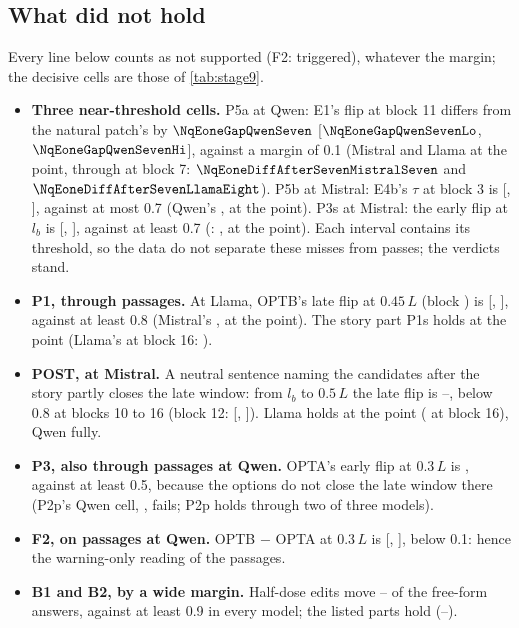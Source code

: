 \subsection{What did not hold}\label{app:s9-misses}

Every line below counts as not supported (F2: triggered), whatever the margin; the decisive cells are those of \cref{tab:stage9}.
\begin{itemize}\setlength\itemsep{1pt}
  \item \textbf{Three near-threshold cells.} P5a at Qwen: E1's \fmtListA{} flip at block 11 differs from the natural patch's by $\NqEoneGapQwenSeven$ [$\NqEoneGapQwenSevenLo$, $\NqEoneGapQwenSevenHi$], against a margin of 0.1 (Mistral and Llama at the point, through \fmtListA{} at block 7: $\NqEoneDiffAfterSevenMistralSeven$ and $\NqEoneDiffAfterSevenLlamaEight$). P5b at Mistral: E4b's $\tau$ at block 3 is \NqTauEfourbThreeMistralSeven{} [\NqTauEfourbThreeMistralSevenLo{}, \NqTauEfourbThreeMistralSevenHi{}], against at most 0.7 (Qwen's \NqTauEfourbThreeQwenSeven{}, at the point). P3s at Mistral: the early \fmtListA{} flip at $l_b$ is \NqPthreeEarlyAfterMistralSeven{} [\NqPthreeEarlyAfterMistralSevenLo{}, \NqPthreeEarlyAfterMistralSevenHi{}], against at least 0.7 (\fmtLetter{}: \NqPthreeEarlyLetterMistralSeven{}, at the point). Each interval contains its threshold, so the data do not separate these misses from passes; the verdicts stand.
  \item \textbf{P1, through passages.} At Llama, OPTB's late flip at $0.45\,L$ (block \NqPsgOnsetFortyfiveLlamaEight) is \NqPsgLateOptbFortyfiveLlamaEight{} [\NqPsgLateOptbFortyfiveLlamaEightLo{}, \NqPsgLateOptbFortyfiveLlamaEightHi{}], against at least 0.8 (Mistral's \NqPsgLateOptbFortyfiveMistralSeven{}, at the point). The story part P1s holds at the point (Llama's \fmtBefore{} at block 16: \NqPoneMinLlamaEight{}).
  \item \textbf{POST, at Mistral.} A neutral sentence naming the candidates after the story partly closes the late window: from $l_b$ to $0.5\,L$ the late flip is \NqPostLateFromLbMinMistralSeven{}--\NqPostLateFromLbMaxMistralSeven{}, below 0.8 at blocks 10 to 16 (block 12: \NqPostLateTwelveMistralSeven{} [\NqPostLateTwelveMistralSevenLo{}, \NqPostLateTwelveMistralSevenHi{}]). Llama holds at the point (\NqPostLateFromLbMinLlamaEight{} at block 16), Qwen fully.
  \item \textbf{P3, also through passages at Qwen.} OPTA's early flip at $0.3\,L$ is \NqPsgEarlyOptaThirtyQwenSeven{}, against at least 0.5, because the options do not close the late window there (P2p's Qwen cell, \NqPsgLateOptaThirtyQwenSeven{}, fails; P2p holds through two of three models).
  \item \textbf{F2, on passages at Qwen.} OPTB $-$ OPTA at $0.3\,L$ is \NqPsgGapQwenSeven{} [\NqPsgGapQwenSevenLo{}, \NqPsgGapQwenSevenHi{}], below 0.1: hence the warning-only reading of the passages.
  \item \textbf{B1 and B2, by a wide margin.} Half-dose edits move \NqHalfNoneMin{}--\NqHalfNoneMax{} of the free-form answers, against at least 0.9 in every model; the listed parts hold (\NqHalfAfterMin{}--\NqHalfAfterMax{}).
\end{itemize}

